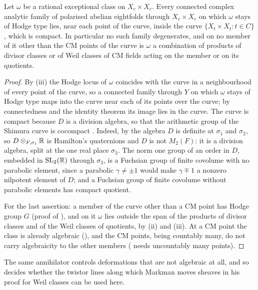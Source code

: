\begin{corollary}
\label{cor:nodegeneration}
Let $\omega$ be a rational exceptional class on $X_{c}\times X_{c}$. Every
connected complex analytic family of polarised abelian eightfolds through
$X_{c}\times X_{c}$ on which $\omega$ stays of Hodge type lies, near each
point of the curve, inside the curve $\{X_{t}\times X_{t}:t\in C\}$, which is
compact. In particular no such family degenerates, and on no member of it
other than the CM points of the curve is $\omega$ a combination of products
of divisor classes or of Weil classes of CM fields acting on the member or on
its quotients.
\end{corollary}

\begin{proof}
By (iii) the Hodge locus of $\omega$ coincides with the
curve in a neighbourhood of every point of the curve, so a connected family
through $Y$ on which $\omega$ stays of Hodge type maps into the curve near
each of its points over the curve; by connectedness and the identity theorem
its image lies in the curve. The curve is compact because $D$ is a division
algebra, so that the arithmetic group of the Shimura curve is cocompact
\cite{Mum69}. Indeed, by  the algebra $D$ is definite at
$\sigma_{1}$ and $\sigma_{2}$, so $D\otimes_{F,\sigma_{1}}\mathbb{R}$ is Hamilton's
quaternions and $D$ is not $M_{2}(F)$: it is a division algebra, split at the
one real place $\sigma_{3}$. The norm one group of an order in $D$, embedded
in $\operatorname{SL}_{2}(\mathbb{R})$ through $\sigma_{3}$, is a Fuchsian group of finite
covolume with no parabolic element, since a parabolic $\gamma\ne\pm1$ would
make $\gamma\mp1$ a nonzero nilpotent element of $D$; and a Fuchsian group of
finite covolume without parabolic elements has compact quotient.

For the last assertion: a member of the curve other than a CM point has
Hodge group $G$ (proof of ), and on it $\omega$ lies
outside the span of the products of divisor classes and of the Weil classes
of quotients, by (ii) and (iii). At a CM point the
class is already algebraic (), and the CM points, being
countably many, do not carry algebraicity to the other members
( needs uncountably many points).
\end{proof}

The same annihilator controls deformations that are not algebraic at all,
and so decides whether the twistor lines along which Markman moves sheaves
in his proof for Weil classes can be used here.

